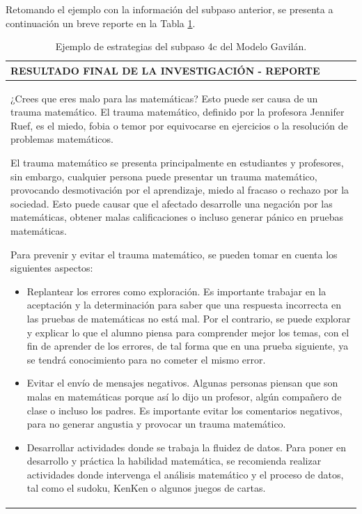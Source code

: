 Retomando el ejemplo con la información del subpaso anterior, se presenta a continuación un breve reporte en la Tabla \ref{tab:t8}.

\begin{table}[H]
  \begin{center}
    \begin{tabular}{ | p{16cm} | }
      \hline
      RESULTADO FINAL DE LA INVESTIGACIÓN - REPORTE \\ \hline
      ¿Crees que eres malo para las matemáticas? Esto puede ser causa de un trauma matemático. El trauma matemático, definido por la profesora Jennifer Ruef, es el miedo, fobia o temor por equivocarse en ejercicios o la resolución de problemas matemáticos.
      
      El trauma matemático se presenta principalmente en estudiantes y profesores, sin embargo, cualquier persona puede presentar un trauma matemático, provocando desmotivación por el aprendizaje, miedo al fracaso o rechazo por la sociedad. Esto puede causar que el afectado desarrolle una negación por las matemáticas, obtener malas calificaciones o incluso generar pánico en pruebas matemáticas.
      
      Para prevenir y evitar el trauma matemático, se pueden tomar en cuenta los siguientes aspectos:

      \begin{itemize}
        \item Replantear los errores como exploración. Es importante trabajar en la aceptación y la determinación para saber que una respuesta incorrecta en las pruebas de matemáticas no está mal. Por el contrario, se puede explorar y explicar lo que el alumno piensa para comprender mejor los temas, con el fin de aprender de los errores, de tal forma que en una prueba siguiente, ya se tendrá conocimiento para no cometer el mismo error.
        \item Evitar el envío de mensajes negativos. Algunas personas piensan que son malas en matemáticas porque así lo dijo un profesor, algún compañero de clase o incluso los padres. Es importante evitar los comentarios negativos, para no generar angustia y provocar un trauma matemático.
        \item Desarrollar actividades donde se trabaja la fluidez de datos. Para poner en desarrollo y práctica la habilidad matemática, se recomienda realizar actividades donde intervenga el análisis matemático y el proceso de datos, tal como el sudoku, KenKen o algunos juegos de cartas.
      \end{itemize}

      \\ \hline
    \end{tabular}
    \caption{Ejemplo de estrategias del subpaso 4c del Modelo Gavilán.}
    \label{tab:t8}
  \end{center}
\end{table}

